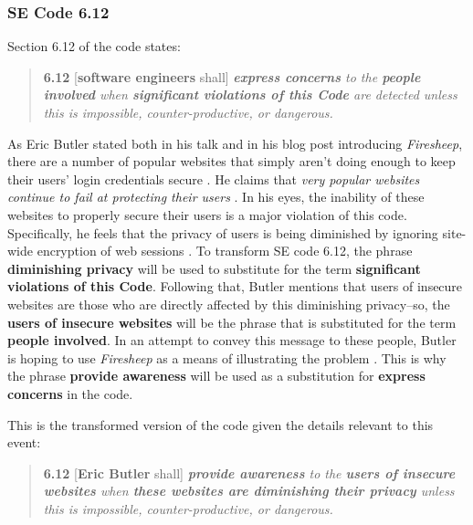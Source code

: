 \documentclass[11pt]{article}
\begin{document}
\begin{multicols}{2}
\subsubsection{SE Code 6.12}
Section 6.12 of the code states:
\begin{quote}
  \textbf{6.12} [\textbf{software engineers} shall] \emph{\textbf{express concerns} to the \textbf{people involved} when \textbf{significant violations of this Code} are detected unless this is impossible, counter-productive, or dangerous.} \cite{se_code}
\end{quote}

As Eric Butler stated both in his talk and in his blog post introducing \emph{Firesheep}, there are a number of popular websites that simply aren't doing enough to keep their users' login credentials secure \cite{toorcon_slides} \cite{codebutler_main}. He claims that \emph{very popular websites continue to fail at protecting their users} \cite{codebutler_main}. In his eyes, the inability of these websites to properly secure their users is a major violation of this code. Specifically, he feels that the privacy of users is being diminished by ignoring site-wide encryption of web sessions \cite{codebutler_main} \cite{toorcon_slides}. To transform SE code 6.12, the phrase \textbf{diminishing privacy} will be used to substitute for the term \textbf{significant violations of this Code}. Following that, Butler mentions that users of insecure websites are those who are directly affected by this diminishing privacy--so, the \textbf{users of insecure websites} will be the phrase that is substituted for the term \textbf{people involved}. In an attempt to convey this message to these people, Butler is hoping to use \emph{Firesheep} as a means of illustrating the problem \cite{codebutler_main} \cite{toorcon_slides}. This is why the phrase \textbf{provide awareness} will be used as a substitution for \textbf{express concerns} in the code.

This is the transformed version of the code given the details relevant to this event:

\begin{quote}
  \textbf{6.12} [\textbf{Eric Butler} shall] \emph{\textbf{provide awareness} to the \textbf{users of insecure websites} when \textbf{these websites are diminishing their privacy} unless this is impossible, counter-productive, or dangerous.}
\end{quote}


\end{multicols}
\end{document}
